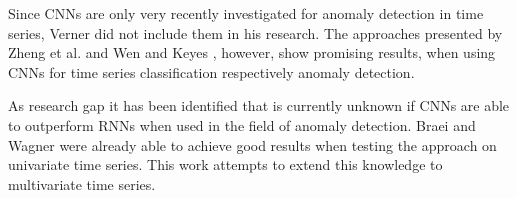 Since CNNs are only very recently investigated for anomaly detection in time series, Verner \parencite*{Verner2019} did not include them in his research. The approaches presented by Zheng et al. \parencite*{Zheng2014} and Wen and Keyes \parencite*{Wen2019}, however, show promising results, when using CNNs for time series classification respectively anomaly detection. 

As research gap it has been identified that is currently unknown if CNNs are able to outperform RNNs when used in the field of anomaly detection. Braei and Wagner \parencite*{Braei2020} were already able to achieve good results when testing the approach on univariate time series. This work attempts to extend this knowledge to multivariate time series.


